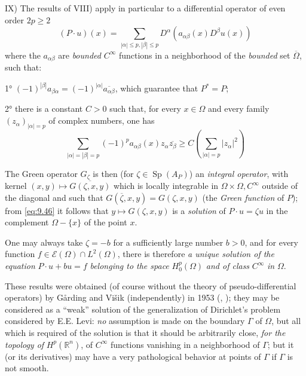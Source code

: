 \documentclass[12pt,a4paper,leqno,twoside]{extbook}
\newcommand{\R}{\mathbb{R}}
\newcommand{\spec}{\operatorname{Sp}}
\begin{document}
IX) The results of VIII) apply in particular to a differential operator of even order \(2p \geq 2\)
\begin{equation}
    \label{eq:9.47}
    (P \cdot u)(x) = \sum_{|\alpha| \leq p, |\beta| \leq p} D^\alpha \left( a_{\alpha \beta}(x) D^\beta u(x) \right)
\end{equation}
where the \(a_{\alpha \beta}\) are \emph{bounded} \(C^\infty\) functions in a neighborhood of the \emph{bounded} set \(\overline{\Omega}\), such that:

1° \((-1)^{|\beta|} a_{\beta \alpha} = (-1)^{|\alpha|} \overline{a_{\alpha \beta}}\), which guarantee that \(P^* = P\);

2° there is a constant \(C > 0\) such that, for every \(x \in \Omega\) and every family \((z_\alpha)_{|\alpha|=p}\) of complex numbers, one has
\begin{equation}
    \label{eq:9.48}
    \sum_{|\alpha|=|\beta|=p} (-1)^p a_{\alpha \beta}(x) z_\alpha \overline{z_\beta}
    \geq
    C \left( \sum_{|\alpha|=p} |z_\alpha|^2 \right)
\end{equation}

The Green operator \(G_\zeta\) is then (for \(\zeta \in \spec(A_P)\)) an \emph{integral operator}, with kernel \((x,y) \mapsto \overline{G(\zeta,x,y)}\) which is locally integrable in \(\Omega \times \Omega, C^\infty\) outside of the diagonal and such that \(G(\overline{\zeta}, x, y) = G(\zeta, x, y)\) (the \emph{Green function} of \(P\)); from \eqref{eq:9.46} it follows that \(y \mapsto G(\zeta, x, y)\) is a \emph{solution} of \(P \cdot u = \zeta u\) in the complement \(\Omega - \{x\}\) of the point \(x\).

One may always take \(\zeta = -b\) for a sufficiently large number \(b > 0\), and for every function \(f \in \mathcal{E}(\Omega) \cap L^2(\Omega)\), there is therefore \emph{a unique solution of the equation} \(P \cdot u + bu = f\) \emph{belonging to the space} \(H^p_0(\Omega)\) \emph{and of class} \(C^\infty\) \emph{in} \(\Omega\).

These results were obtained (of course without the theory of pseudo-differential operators) by Gårding and Višik (independently) in 1953 (\cite{080}, \cite{218}); they may be considered as a ``weak'' solution of the generalization of Dirichlet's problem considered by E.E. Levi: \emph{no} assumption is made on the boundary \(\Gamma\) of \(\Omega\), but all which is required of the solution is that it should be arbitrarily close, \emph{for the topology of} \(H^p(\R^n)\), of \(C^\infty\) functions vanishing in a neighborhood of \(\Gamma\); but it (or its derivatives) may have a very pathological behavior at points of \(\Gamma\) if \(\Gamma\) is not smooth.
\end{document}
